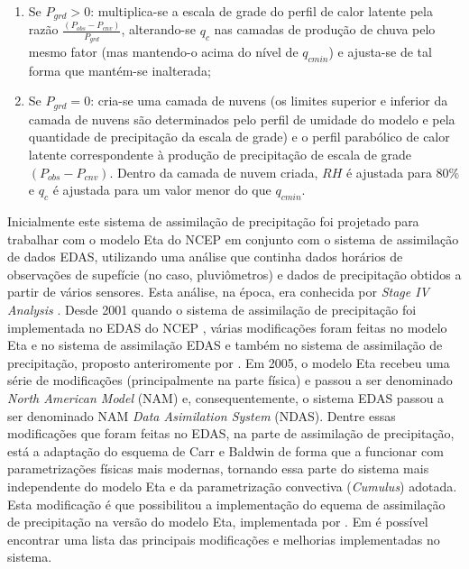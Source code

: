 \begin{enumerate}
\item Se $P_{grd}>0$: multiplica-se a escala de grade do perfil de calor latente pela razão $\frac{(P_{obs}-P_{cnv})}{P_{grd}}$, alterando-se $q_{c}$ nas camadas de produção de chuva pelo mesmo fator (mas mantendo-o acima do nível de $q_{cmin}$) e ajusta-se de tal forma que mantém-se inalterada;
\item Se $P_{grd}=0$: cria-se uma camada de nuvens (os limites superior e inferior da camada de nuvens são determinados pelo perfil de umidade do modelo e pela quantidade de precipitação da escala de grade) e o perfil parabólico de calor latente correspondente à produção de precipitação de escala de grade $(P_{obs}-P_{cnv})$. Dentro da camada de nuvem criada, $RH$ é ajustada para 80\% e $q_{c}$ é ajustada para um valor menor do que $q_{cmin}$.
\end{enumerate}

Inicialmente este sistema de assimilação de precipitação foi projetado para trabalhar com o modelo Eta do NCEP em conjunto com o sistema de assimilação de dados EDAS, utilizando uma análise que continha dados horários de observações de supefície (no caso, pluviômetros) e dados de precipitação obtidos a partir de vários sensores. Esta análise, na época, era conhecida por \textit{Stage IV Analysis} \cite{linetal01}. Desde 2001 quando o sistema de assimilação de precipitação foi implementada no EDAS do NCEP \cite{rogersetal01}, várias modificações foram feitas no modelo Eta e no sistema de assimilação EDAS e também no sistema de assimilação de precipitação, proposto anteriromente por . Em 2005, o modelo Eta recebeu uma série de modificações (principalmente na parte física) e passou a ser denominado \textit{North American Model} (NAM) e, consequentemente, o sistema EDAS passou a ser denominado NAM \textit{Data Asimilation System} (NDAS). Dentre essas modificações que foram feitas no EDAS, na parte de assimilação de precipitação, está a adaptação do esquema de Carr e Baldwin de forma que a funcionar com parametrizações físicas mais modernas, tornando essa parte do sistema mais independente do modelo Eta e da parametrização convectiva (\textit{Cumulus}) adotada. Esta modificação é que possibilitou a implementação do equema de assimilação de precipitação na versão do modelo Eta, implementada por . Em  é possível encontrar uma lista das principais modificações e melhorias implementadas no sistema.

